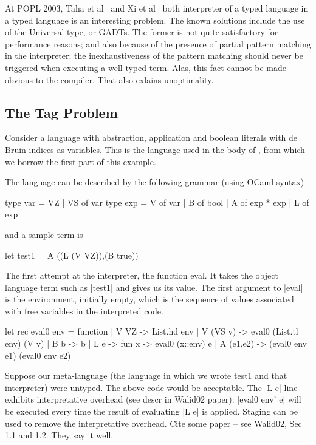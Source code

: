 \documentclass[preprint]{sigplanconf}
\newcommand{\oleg}[1]{{\it [Oleg says: #1]}}
\begin{document}
    At POPL 2003, Taha et al~\cite{TahaPOPL03} and Xi et al~\cite{XiPOPL03}
both
interpreter of a typed language in a typed language is an interesting
problem. The known solutions include the use of the Universal type, or
GADTs. The former is not quite satisfactory for performance reasons;
and also because of the presence of partial pattern matching in the
interpreter; the inexhaustiveness of the pattern matching should never
be triggered when executing a well-typed term. Alas, this fact cannot
be made obvious to the compiler. That also exlains unoptimality.


\subsection{The Tag Problem}\label{tagproblem}


Consider a language with abstraction, application and boolean
literals with de Bruin indices as variables. This is the language used
in the body of \cite{WalidIFCP02}, from which we borrow the first part of 
this example.

The language can be described by the following grammar (using OCaml
syntax)


\begin{code}
  type var = VZ | VS of var
  type exp = V of var | B of bool | A of exp * exp | L of exp
\end{code}

and a sample term is
\begin{code}
  let test1 = A ((L (V VZ)),(B true))
\end{code}

The first attempt at the interpreter, the function eval. It takes the
object language term such as |test1| and gives us its value.
The first argument to |eval| is the environment, initially empty,
which is the sequence of values associated with free variables in the
interpreted code.
\begin{code}
  let rec eval0 env = function 
  | V VZ -> List.hd env
  | V (VS v) -> eval0 (List.tl env) (V v)
  | B b -> b 
  | L e -> fun x -> eval0 (x::env) e
  | A (e1,e2) -> (eval0 env e1) (eval0 env e2) 
\end{code}

Suppose our meta-language (the language in which we wrote test1
and that interpreter) were untyped. The above code would be acceptable.
The |L e| line exhibits interpretative overhead (see descr in Walid02
paper): |eval0 env' e| will be executed every time the result of
evaluating |L e| is applied. Staging can be used to remove the
interpretative overhead. Cite some paper -- see Walid02, Sec 1.1 and
1.2. They say it well.
\end{document}
